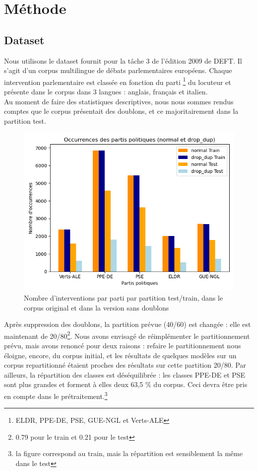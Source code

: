 \section{Méthode}

\subsection{Dataset}

Nous utilisons le dataset fournit pour la tâche 3 de l’édition 2009 de DEFT.
Il s'agit d'un corpus multilingue de débats parlementaires européens. Chaque intervention
parlementaire est classée en fonction du parti \footnote {ELDR, PPE-DE, PSE, GUE-NGL et Verts-ALE}
du locuteur et présente dans le corpus dans 3 langues : anglais, français et italien.\\
Au moment de faire des statistiques descriptives, nous nous sommes rendus comptes 
que le corpus présentait des doublons, et ce majoritairement dans la partition test.
\begin{figure}[ht]
    \centering
    \includegraphics[width=\columnwidth]{../stats/occurences_orig_vs_drop_dup_par_cat.png}
    \caption{Nombre d'interventions par parti par partition test/train, dans le corpus original et dans la version sans doublons}
    \label{fig:barplot_dataset}
\end{figure}

Après suppression des doublons, la partition prévue (40/60) est changée : elle est 
maintenant de 20/80\footnote{ 0.79 pour le train et 0.21 pour le test}.
Nous avons envisagé de réimplémenter le partitionnement prévu, mais avons renoncé pour deux raisons : 
refaire le partitionnement nous éloigne, encore, du corpus initial, et les 
résultats de quelques modèles sur un corpus repartitionné étaient proches des résultats 
sur cette partition 20/80.
Par ailleurs, la répartition des classes est déséquilibrée : les classes PPE-DE et PSE sont plus grandes et forment à elles deux 63,5 \% du corpus. Ceci devra être 
pris en compte dans le prétraitement.\footnote{la figure correspond au train, mais la répartition est sensiblement la même dans le test}

